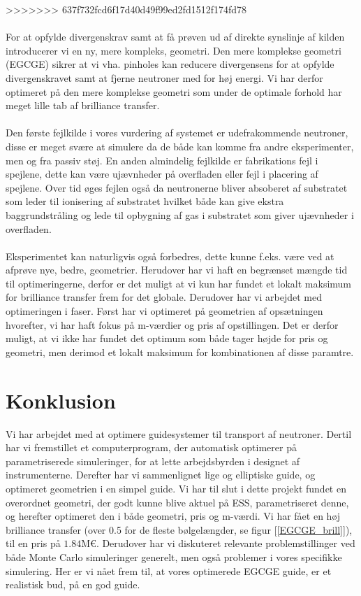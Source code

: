 \documentclass[12pt,oneside,a4paper]{article}
\begin{document}
{{{{{>>>>>>> 637f732fcd6f17d40d49f99ed2fd1512f174fd78
\\
\\
For at opfylde divergenskrav samt at få prøven ud af direkte synslinje af kilden introducerer vi en ny, mere kompleks, geometri. Den mere komplekse geometri (EGCGE) sikrer at vi vha. pinholes kan reducere divergensens for at opfylde divergenskravet samt at fjerne neutroner med for høj energi. Vi har derfor optimeret på den mere komplekse geometri som under de optimale forhold har meget lille tab af brilliance transfer.
\\
\\
Den første fejlkilde i vores vurdering af systemet er udefrakommende neutroner, disse er meget svære at simulere da de både kan komme fra andre eksperimenter, men og fra passiv støj. En anden almindelig fejlkilde er fabrikations fejl i spejlene, dette kan være ujævnheder på overfladen eller fejl i placering af spejlene. Over tid øges fejlen også da neutronerne bliver absoberet af substratet som leder til ionisering af substratet hvilket både kan give ekstra baggrundstråling og lede til opbygning af gas i substratet som giver ujævnheder i overfladen.
\\
\\
Eksperimentet kan naturligvis også forbedres, dette kunne f.eks. være ved at afprøve nye, bedre, geometrier. Herudover har vi haft en begrænset mængde tid til optimeringerne, derfor er det muligt at vi kun har fundet et lokalt maksimum for brilliance transfer frem for det globale. Derudover har vi arbejdet med optimeringen i faser. Først har vi optimeret på geometrien af opsætningen hvorefter, vi har haft fokus på m-værdier og pris af opstillingen. Det er derfor muligt, at vi ikke har fundet det optimum som både tager højde for pris og geometri, men derimod et lokalt maksimum for kombinationen af disse paramtre.

\section{Konklusion}
Vi har arbejdet med at optimere guidesystemer til transport af neutroner. Dertil har vi fremstillet et computerprogram, der automatisk optimerer på parametriserede simuleringer, for at lette arbejdsbyrden i designet af instrumenterne. Derefter har vi sammenlignet lige og elliptiske guide, og optimeret geometrien i en simpel guide. Vi har til slut i dette projekt fundet en overordnet geometri, der godt kunne blive aktuel på ESS, parametriseret denne, og herefter optimeret den i både geometri, pris og m-værdi. Vi har fået en høj brilliance transfer (over 0.5 for de fleste bølgelængder, se figur [\ref{EGCGE_brill}]), til en pris på $1.84\text{M€}$. Derudover har vi diskuteret relevante problemstillinger ved både Monte Carlo simuleringer generelt, men også problemer i vores specifikke simulering. Her er vi nået frem til, at vores optimerede EGCGE guide, er et realistisk bud, på en god guide.


}}}}}
\end{document}
